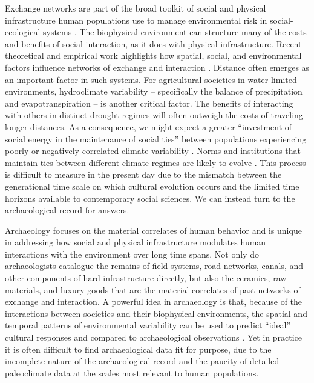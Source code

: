 \documentclass[11pt]{iopart}
\begin{document}
Exchange networks are part of the broad toolkit of social and physical infrastructure human populations use to manage environmental risk in social-ecological systems \parencite{Anderies2015}. The biophysical environment can structure many of the costs and benefits of social interaction, as it does with physical infrastructure. Recent theoretical and empirical work highlights how spatial, social, and environmental factors influence networks of exchange and interaction \parencite{Fafchamps2007,Bloch2008,Nolin2010,Verdery2012,Freeman2014,Koster2014,Hao2015a,Schnegg2015}. Distance often emerges as an important factor in such systems. For agricultural societies in water-limited environments, hydroclimate variability -- specifically the balance of precipitation and evapotranspiration -- is another critical factor. The benefits of interacting with others in distinct drought regimes will often outweigh the costs of traveling longer distances. As a consequence, we might expect a greater ``investment of social energy in the maintenance of social ties'' between populations experiencing poorly or negatively correlated climate variability \parencite{Rautman1993a}. Norms and institutions that maintain ties between different climate regimes are likely to evolve \parencite{Durante2009}. This process is difficult to measure in the present day due to the mismatch between the generational time scale on which cultural evolution occurs and the limited time horizons available to contemporary social sciences. We can instead turn to the archaeological record for answers. 

Archaeology focuses on the material correlates of human behavior and is unique in addressing how social and physical infrastructure modulates human interactions with the environment over long time spans. Not only do archaeologists catalogue the remains of field systems, road networks, canals, and other components of hard infrastructure directly, but also the ceramics, raw materials, and luxury goods that are the material correlates of past networks of exchange and interaction. A powerful idea in archaeology is that, because of the interactions between societies and their biophysical environments, the spatial and temporal patterns of environmental variability can be used to predict ``ideal'' cultural responses and compared to archaeological observations \parencite{Halstead1989}. Yet in practice it is often difficult to find archaeological data fit for purpose, due to the incomplete nature of the archaeological record and the paucity of detailed paleoclimate data at the scales most relevant to human populations. 
\end{document}
